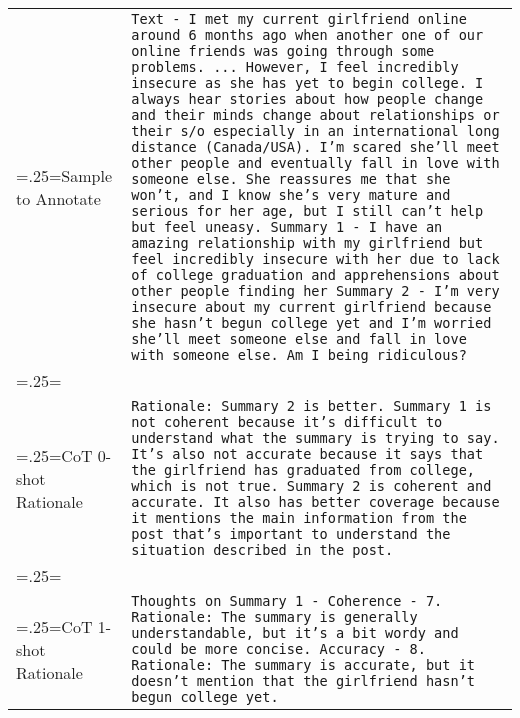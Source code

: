 \documentclass[11pt]{article}
\begin{document}
\begin{table*}[ht]
\small
\centering
    \begin{tabularx}{\linewidth}{>{\hsize=.25\hsize\linewidth=\hsize}X|X}
    Sample to Annotate & \texttt{Text - I met my current girlfriend online around 6 months ago when another one of our online friends was going through some problems. ...
    \newline
    \newline
    However, I feel incredibly insecure as she has yet to begin college. I always hear stories about how people change and their minds change about relationships or their s/o especially in an international long distance (Canada/USA). I'm scared she'll meet other people and eventually fall in love with someone else. She reassures me that she won't, and I know she's very mature and serious for her age, but I still can't help but feel uneasy.
    \newline
    \newline
    Summary 1 - I have an amazing relationship with my girlfriend but feel incredibly insecure with her due to lack of college graduation and apprehensions about other people finding her
    \newline
    \newline
    Summary 2 - I'm very insecure about my current girlfriend because she hasn't begun college yet and I'm worried she'll meet someone else and fall in love with someone else. Am I being ridiculous?} \\
    \\
    CoT 0-shot Rationale & \texttt{Rationale: Summary 2 is better.
    \newline
    \newline
    Summary 1 is not coherent because it's difficult to understand what the summary is trying to say. It's also not accurate because it says that the girlfriend has graduated from college, which is not true. Summary 2 is coherent and accurate. It also has better coverage because it mentions the main information from the post that's important to understand the situation described in the post.} \\
    \\
    CoT 1-shot Rationale & \texttt{Thoughts on Summary 1 - \newline
    Coherence - 7. Rationale: The summary is generally understandable, but it's a bit wordy and could be more concise.
    \newline
    Accuracy - 8. Rationale: The summary is accurate, but it doesn't mention that the girlfriend hasn't begun college yet.
}
\end{tabularx}
\end{table*}
\end{document}
